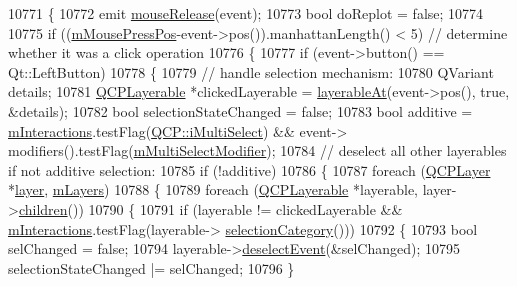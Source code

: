 \begin{DoxyCode}
10771 \{
10772   emit \hyperlink{class_q_custom_plot_ac8dc0ee6bb98e923c00b4ebafbe6134d}{mouseRelease}(event);
10773   \textcolor{keywordtype}{bool} doReplot = \textcolor{keyword}{false};
10774   
10775   \textcolor{keywordflow}{if} ((\hyperlink{class_q_custom_plot_ac57090da95056ae4dd67be67adfa85bd}{mMousePressPos}-event->pos()).manhattanLength() < 5) \textcolor{comment}{// determine whether it was a
       click operation}
10776   \{
10777     \textcolor{keywordflow}{if} (event->button() == Qt::LeftButton)
10778     \{
10779       \textcolor{comment}{// handle selection mechanism:}
10780       QVariant details;
10781       \hyperlink{class_q_c_p_layerable}{QCPLayerable} *clickedLayerable = \hyperlink{class_q_custom_plot_a3fffd1d8364f657482ae985e0b5aa028}{layerableAt}(event->pos(), \textcolor{keyword}{true}, &details);
10782       \textcolor{keywordtype}{bool} selectionStateChanged = \textcolor{keyword}{false};
10783       \textcolor{keywordtype}{bool} additive = \hyperlink{class_q_custom_plot_ad717377ceba7493b4b32f0bcbbdf1895}{mInteractions}.testFlag(\hyperlink{namespace_q_c_p_a2ad6bb6281c7c2d593d4277b44c2b037aef673112c5067c3cf4cfddb62da7265d}{QCP::iMultiSelect}) && \textcolor{keyword}{event}->
      modifiers().testFlag(\hyperlink{class_q_custom_plot_a0e97e701c5671e7e463d2ce0211d0f8a}{mMultiSelectModifier});
10784       \textcolor{comment}{// deselect all other layerables if not additive selection:}
10785       \textcolor{keywordflow}{if} (!additive)
10786       \{
10787         \textcolor{keywordflow}{foreach} (\hyperlink{class_q_c_p_layer}{QCPLayer} *\hyperlink{class_q_custom_plot_aac492da01782820454e9136a8db28182}{layer}, \hyperlink{class_q_custom_plot_a72ee313041b873d76c198793ce7e6c37}{mLayers})
10788         \{
10789           \textcolor{keywordflow}{foreach} (\hyperlink{class_q_c_p_layerable}{QCPLayerable} *layerable, layer->\hyperlink{class_q_c_p_layer_a94c2f0100e48cefad2de8fe0fbb03c27}{children}())
10790           \{
10791             \textcolor{keywordflow}{if} (layerable != clickedLayerable && \hyperlink{class_q_custom_plot_ad717377ceba7493b4b32f0bcbbdf1895}{mInteractions}.testFlag(layerable->
      \hyperlink{class_q_c_p_layerable_aa4035e586b7f317a06ba7e74e242a5ea}{selectionCategory}()))
10792             \{
10793               \textcolor{keywordtype}{bool} selChanged = \textcolor{keyword}{false};
10794               layerable->\hyperlink{class_q_c_p_layerable_ae546370644a5551c76af739afc008bee}{deselectEvent}(&selChanged);
10795               selectionStateChanged |= selChanged;
10796             \}

\end{DoxyCode}
